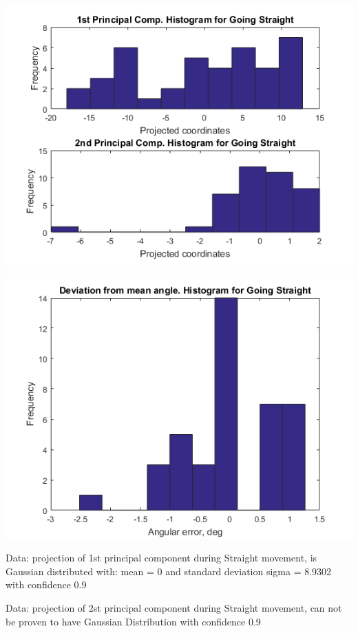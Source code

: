 \documentclass[a4paper, 12pt]{article}
\begin{document}
\begin{center}
  \includegraphics[scale=0.6]{s2}
  
  
  \includegraphics[scale=0.6]{s3}
\end{center}

Data: projection of 1st principal component during  Straight movement, is Gaussian distributed with: mean = 0 and standard deviation sigma = 8.9302 with confidence 0.9%


\smallskip

Data:  projection of 2st principal component during  Straight movement, can not be proven to have Gaussian Distribution with confidence 0.9%


\smallskip
\end{document}
